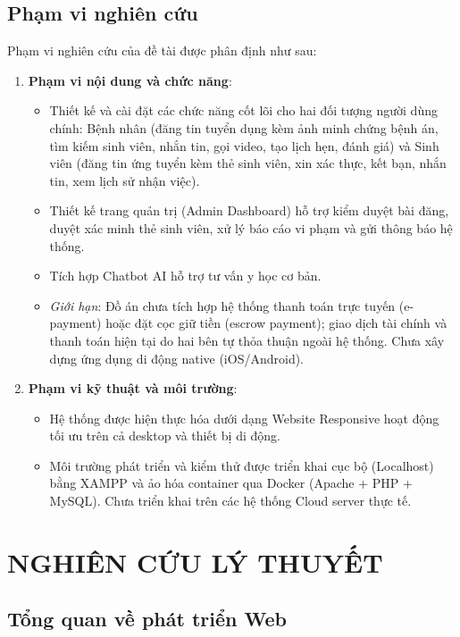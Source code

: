 \documentclass[a4paper,13pt]{extreport}
\begin{document}
\section{Phạm vi nghiên cứu}
Phạm vi nghiên cứu của đề tài được phân định như sau:
\begin{enumerate}
    \item \textbf{Phạm vi nội dung và chức năng}:
    \begin{itemize}
        \item Thiết kế và cài đặt các chức năng cốt lõi cho hai đối tượng người dùng chính: Bệnh nhân (đăng tin tuyển dụng kèm ảnh minh chứng bệnh án, tìm kiếm sinh viên, nhắn tin, gọi video, tạo lịch hẹn, đánh giá) và Sinh viên (đăng tin ứng tuyển kèm thẻ sinh viên, xin xác thực, kết bạn, nhắn tin, xem lịch sử nhận việc).
        \item Thiết kế trang quản trị (Admin Dashboard) hỗ trợ kiểm duyệt bài đăng, duyệt xác minh thẻ sinh viên, xử lý báo cáo vi phạm và gửi thông báo hệ thống.
        \item Tích hợp Chatbot AI hỗ trợ tư vấn y học cơ bản.
        \item \textit{Giới hạn}: Đồ án chưa tích hợp hệ thống thanh toán trực tuyến (e-payment) hoặc đặt cọc giữ tiền (escrow payment); giao dịch tài chính và thanh toán hiện tại do hai bên tự thỏa thuận ngoài hệ thống. Chưa xây dựng ứng dụng di động native (iOS/Android).
    \end{itemize}
    \item \textbf{Phạm vi kỹ thuật và môi trường}:
    \begin{itemize}
        \item Hệ thống được hiện thực hóa dưới dạng Website Responsive hoạt động tối ưu trên cả desktop và thiết bị di động.
        \item Môi trường phát triển và kiểm thử được triển khai cục bộ (Localhost) bằng XAMPP và ảo hóa container qua Docker (Apache + PHP + MySQL). Chưa triển khai trên các hệ thống Cloud server thực tế.
    \end{itemize}
\end{enumerate}


\chapter{NGHIÊN CỨU LÝ THUYẾT}

\section{Tổng quan về phát triển Web}
\end{document}
